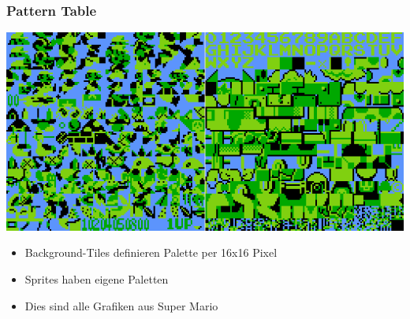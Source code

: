 \documentclass{beamer}
\begin{document}
    
    \begin{frame}
        \frametitle{Pattern Table}
        \includegraphics[width=0.8\linewidth]{img/pattern.png}
        \begin{itemize}
                \item{Background-Tiles definieren Palette per 16x16 Pixel}
                \item{Sprites haben eigene Paletten}
                \item{Dies sind alle Grafiken aus Super Mario}
        \end{itemize}
    \end{frame}
\end{document}
